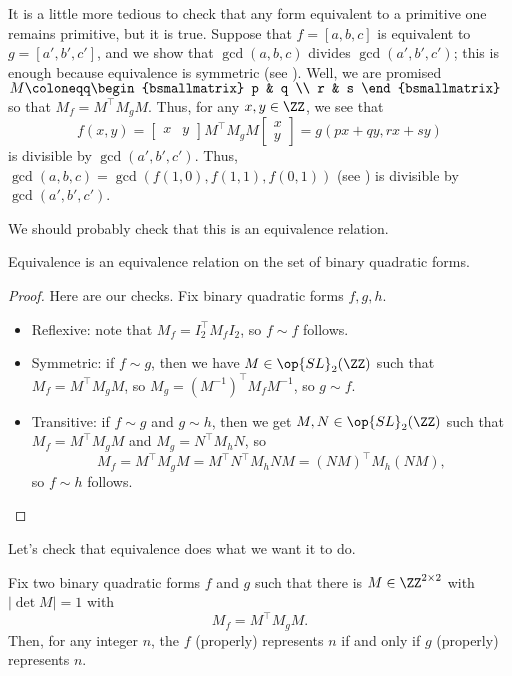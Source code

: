 \documentclass[../notes.tex]{subfiles}
\begin{document}
\begin{remark} \label{rem:equiv-primitives}
	It is a little more tedious to check that any form equivalent to a primitive one remains primitive, but it is true. Suppose that $f=[a,b,c]$ is equivalent to $g=[a',b',c']$, and we show that $\gcd(a,b,c)$ divides $\gcd(a',b',c')$; this is enough because equivalence is symmetric (see ). Well, we are promised $M\coloneqq\begin{bsmallmatrix}
		p & q \\ r & s
	\end{bsmallmatrix}$ so that $M_f=M^\intercal M_gM$. Thus, for any $x,y\in\ZZ$, we see that
	\[f(x,y)=\begin{bmatrix}
		x & y
	\end{bmatrix}M^\intercal M_gM\begin{bmatrix}
		x \\ y
	\end{bmatrix}=g(px+qy,rx+sy)\]
	is divisible by $\gcd(a',b',c')$. Thus, $\gcd(a,b,c)=\gcd(f(1,0),f(1,1),f(0,1))$ (see ) is divisible by $\gcd(a',b',c')$.
\end{remark}
We should probably check that this is an equivalence relation.
\begin{lemma} \label{lem:equiv-is-equiv-relation}
	Equivalence is an equivalence relation on the set of binary quadratic forms.
\end{lemma}
\begin{proof}
	Here are our checks. Fix binary quadratic forms $f,g,h$.
	\begin{itemize}
		\item Reflexive: note that $M_f=I_2^\intercal M_fI_2$, so $f\sim f$ follows.
		\item Symmetric: if $f\sim g$, then we have $M\in\op{SL}_2(\ZZ)$ such that $M_f=M^\intercal M_gM$, so $M_g=\left(M^{-1}\right)^\intercal M_fM^{-1}$, so $g\sim f$.
		\item Transitive: if $f\sim g$ and $g\sim h$, then we get $M,N\in\op{SL}_2(\ZZ)$ such that $M_f=M^\intercal M_gM$ and $M_g=N^\intercal M_hN$, so
		\[M_f=M^\intercal M_gM=M^\intercal N^\intercal M_hNM=(NM)^\intercal M_h(NM),\]
		so $f\sim h$ follows.
		\qedhere
	\end{itemize}
\end{proof}
Let's check that equivalence does what we want it to do.
\begin{lemma} \label{lem:equiv-has-same-outputs}
	Fix two binary quadratic forms $f$ and $g$ such that there is $M\in\ZZ^{2\times2}$ with $\left|\det M\right|=1$ with
	\[M_f=M^\intercal M_gM.\]
	Then, for any integer $n$, the $f$ (properly) represents $n$ if and only if $g$ (properly) represents $n$.
\end{lemma}
\end{document}
